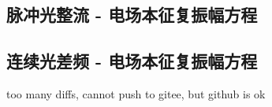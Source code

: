 \subsection{脉冲光整流 - 电场本征复振幅方程}\label{ssec:OR_spectrum}



\subsection{连续光差频 - 电场本征复振幅方程}\label{ssec:DFG_discrete}

\cite{dregerSecondharmonicGenerationNonlinear1990,zubairyAnalyticApproachSecondharmonic1985}

too many diffs, cannot push to gitee, but github is ok

\cite{katoSecondharmonicGeneration20481986,katoTemperaturetuned90Phasematching1994,brunerTemperaturedependentSellmeierEquation2003,jundtTemperaturedependentSellmeierEquation1997,katoSellmeierThermoopticDispersion2002}

